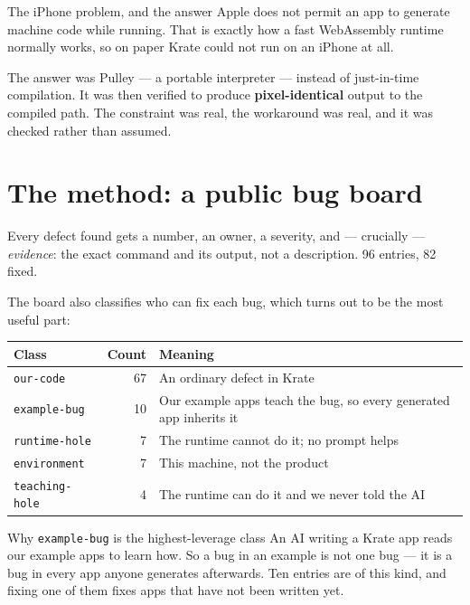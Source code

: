\documentclass[11pt,a4paper]{report}
\begin{document}
\begin{plainbox}{The iPhone problem, and the answer}
Apple does not permit an app to generate machine code while running. That
is exactly how a fast WebAssembly runtime normally works, so on paper
Krate could not run on an iPhone at all.

The answer was Pulley --- a portable interpreter --- instead of
just-in-time compilation. It was then verified to produce
\textbf{pixel-identical} output to the compiled path. The constraint was
real, the workaround was real, and it was checked rather than assumed.
\end{plainbox}

\section{The method: a public bug board}

Every defect found gets a number, an owner, a severity, and --- crucially
--- \emph{evidence}: the exact command and its output, not a description.
96 entries, 82 fixed.

The board also classifies who can fix each bug, which turns out to be the
most useful part:

\begin{center}
\begin{tabular}{lrp{7.6cm}}
\toprule
\textbf{Class} & \textbf{Count} & \textbf{Meaning} \\
\midrule
\texttt{our-code} & 67 & An ordinary defect in Krate \\
\texttt{example-bug} & 10 & Our example apps teach the bug, so every generated app inherits it \\
\texttt{runtime-hole} & 7 & The runtime cannot do it; no prompt helps \\
\texttt{environment} & 7 & This machine, not the product \\
\texttt{teaching-hole} & 4 & The runtime can do it and we never told the AI \\
\bottomrule
\end{tabular}
\end{center}

\begin{plainbox}{Why \texttt{example-bug} is the highest-leverage class}
An AI writing a Krate app reads our example apps to learn how. So a bug in
an example is not one bug --- it is a bug in every app anyone generates
afterwards. Ten entries are of this kind, and fixing one of them fixes
apps that have not been written yet.
\end{plainbox}
\end{document}
